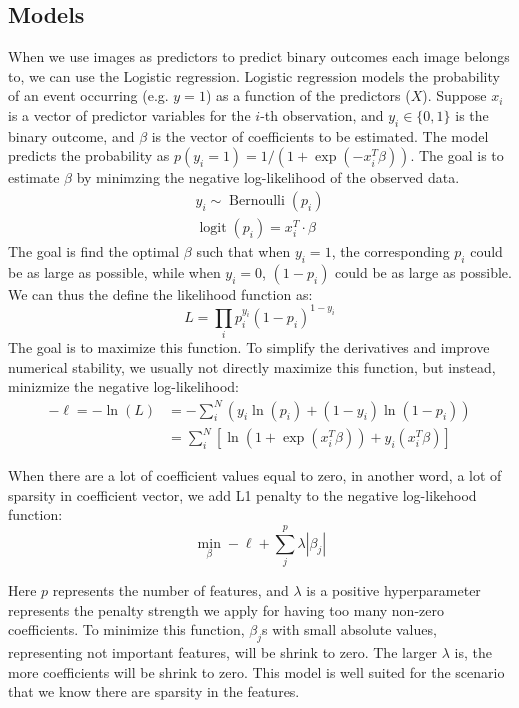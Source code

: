 \documentclass[12pt]{article}
\begin{document}
\subsection{Models}

When we use images as predictors to predict binary outcomes each image belongs to, we can use the Logistic regression. Logistic regression models the probability of an event occurring (e.g. \( y = 1 \)) as a function of the predictors (\( X \)). Suppose \( x_i \) is a vector of predictor variables for the \( i \)-th observation, and \( y_i \in \{0, 1\} \) is the binary outcome, and \( \beta \) is the vector of coefficients to be estimated. The model predicts the probability as \( p(y_i = 1) = 1 / (1 + \exp(-x_i^T \beta)) \). The goal is to estimate \( \beta \) by minimzing the negative log-likelihood of the observed data.
\[
  \begin{gathered}
    y_i \sim \operatorname{Bernoulli} (p_i) \\
    \operatorname{logit} (p_i) = x_i^T \cdot \beta
  \end{gathered}
\]
The goal is find the optimal \( \beta \) such that when \( y_i = 1 \), the corresponding \( p_i \) could be as large as possible, while when \( y_i = 0 \), \( (1 - p_i) \) could be as large as possible. We can thus the define the likelihood function as:
\[
  L = \prod_i p_i^{y_i} (1 - p_i)^{1 - y_i}
\]
The goal is to maximize this function. To simplify the derivatives and improve numerical stability, we usually not directly maximize this function, but instead, minizmize the negative log-likelihood:
\[
  \begin{aligned}
    - \ell = - \ln(L) & =  - \sum_i^N (y_i \ln(p_i) + (1 - y_i) \ln(1 - p_i) ) \\
                      & = \sum_i^N \left[ \ln \left(1 + \exp(x_i^T \beta) \right) + y_i (x_i^T \beta) \right]
  \end{aligned}
\]

When there are a lot of coefficient values equal to zero, in another word, a lot of sparsity in coefficient vector, we add L1 penalty to the negative log-likehood function:
\[
  \min_{\beta} - \ell + \sum_j^p \lambda | \beta_j |
\]

Here \( p \) represents the number of features, and \( \lambda \) is a positive hyperparameter represents the penalty strength we apply for having too many non-zero coefficients. To minimize this function, \( \beta_j \)s with small absolute values, representing not important features, will be shrink to zero. The larger \( \lambda \) is, the more coefficients will be shrink to zero. This model is well suited for the scenario that we know there are sparsity in the features.
\end{document}
